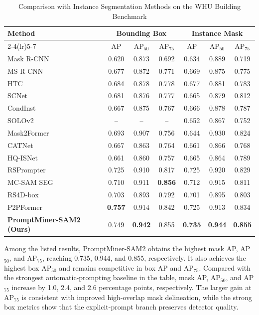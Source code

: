 \documentclass[letterpaper,journal]{IEEEtran}
\begin{document}
\begin{table}[!t]
\caption{Comparison with Instance Segmentation Methods on the WHU Building Benchmark}
\label{tab:whu}
\centering
\footnotesize
\begin{tabular}{lcccccc}
\toprule
\multirow{2}{*}{Method} & \multicolumn{3}{c}{Bounding Box} & \multicolumn{3}{c}{Instance Mask} \\
\cmidrule(lr){2-4}\cmidrule(lr){5-7}
& AP & AP$_{50}$ & AP$_{75}$ & AP & AP$_{50}$ & AP$_{75}$ \\
\midrule
Mask R-CNN~\cite{ref_maskrcnn} & 0.620 & 0.873 & 0.692 & 0.634 & 0.889 & 0.719 \\
MS R-CNN~\cite{ref_msrcnn} & 0.677 & 0.872 & 0.771 & 0.669 & 0.875 & 0.775 \\
HTC~\cite{ref_htc} & 0.684 & 0.878 & 0.778 & 0.677 & 0.881 & 0.783 \\
SCNet~\cite{ref_scnet} & 0.681 & 0.876 & 0.777 & 0.665 & 0.879 & 0.812 \\
CondInst~\cite{ref_condinst} & 0.667 & 0.875 & 0.767 & 0.666 & 0.878 & 0.787 \\
SOLOv2~\cite{ref_solov2} & -- & -- & -- & 0.652 & 0.867 & 0.752 \\
Mask2Former~\cite{ref_mask2former} & 0.693 & 0.907 & 0.756 & 0.644 & 0.930 & 0.824 \\
CATNet~\cite{ref_catnet} & 0.667 & 0.863 & 0.764 & 0.661 & 0.866 & 0.768 \\
HQ-ISNet~\cite{ref_hqisnet} & 0.661 & 0.860 & 0.757 & 0.665 & 0.864 & 0.789 \\
RSPrompter~\cite{ref_rsprompter} & 0.725 & 0.910 & 0.817 & 0.725 & 0.920 & 0.829 \\
MC-SAM SEG~\cite{ref_mcsamseg} & 0.710 & 0.911 & \textbf{0.856} & 0.712 & 0.915 & 0.811 \\
RS4D-box~\cite{ref_rs4d} & 0.703 & 0.893 & 0.792 & 0.701 & 0.895 & 0.803 \\
P2PFormer~\cite{ref_p2pformer} & \textbf{0.757} & 0.914 & 0.842 & 0.725 & 0.913 & 0.834 \\
\textbf{PromptMiner-SAM2 (Ours)} & 0.749 & \textbf{0.942} & 0.855 & \textbf{0.735} & \textbf{0.944} & \textbf{0.855} \\
\bottomrule
\end{tabular}
\end{table}

Among the listed results, PromptMiner-SAM2 obtains the highest mask AP, AP$_{50}$, and AP$_{75}$, reaching 0.735, 0.944, and 0.855, respectively. It also achieves the highest box AP$_{50}$ and remains competitive in box AP and AP$_{75}$. Compared with the strongest automatic-prompting baseline in the table, mask AP, AP$_{50}$, and AP$_{75}$ increase by 1.0, 2.4, and 2.6 percentage points, respectively. The larger gain at AP$_{75}$ is consistent with improved high-overlap mask delineation, while the strong box metrics show that the explicit-prompt branch preserves detector quality.
\end{document}
